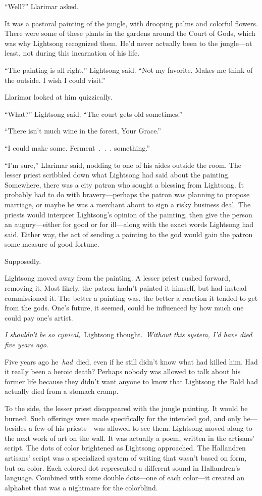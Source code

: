 “Well?” Llarimar asked.

It was a pastoral painting of the jungle, with drooping palms and colorful flowers. There were some of these plants in the gardens around the Court of Gods, which was why Lightsong recognized them. He’d never actually been to the jungle—at least, not during this incarnation of his life.

“The painting is all right,” Lightsong said. “Not my favorite. Makes me think of the outside. I wish I could visit.”

Llarimar looked at him quizzically.

“What?” Lightsong said. “The court gets old sometimes.”

“There isn’t much wine in the forest, Your Grace.”

“I could make some. Ferment~.~.~. something.”

“I’m sure,” Llarimar said, nodding to one of his aides outside the room. The lesser priest scribbled down what Lightsong had said about the painting. Somewhere, there was a city patron who sought a blessing from Lightsong. It probably had to do with bravery—perhaps the patron was planning to propose marriage, or maybe he was a merchant about to sign a risky business deal. The priests would interpret Lightsong’s opinion of the painting, then give the person an augury—either for good or for ill—along with the exact words Lightsong had said. Either way, the act of sending a painting to the god would gain the patron some measure of good fortune.

Supposedly.

Lightsong moved away from the painting. A lesser priest rushed forward, removing it. Most likely, the patron hadn’t painted it himself, but had instead commissioned it. The better a painting was, the better a reaction it tended to get from the gods. One’s future, it seemed, could be influenced by how much one could pay one’s artist.

\textit{I shouldn’t be so cynical,}~Lightsong thought.~\textit{Without this system, I’d have died five years ago.}

Five years ago he~\textit{had}~died, even if he still didn’t know what had killed him. Had it really been a heroic death? Perhaps nobody was allowed to talk about his former life because they didn’t want anyone to know that Lightsong the Bold had actually died from a stomach cramp.

To the side, the lesser priest disappeared with the jungle painting. It would be burned. Such offerings were made specifically for the intended god, and only he—besides a few of his priests—was allowed to see them. Lightsong moved along to the next work of art on the wall. It was actually a poem, written in the artisans’ script. The dots of color brightened as Lightsong approached. The Hallandren artisans’ script was a specialized system of writing that wasn’t based on form, but on color. Each colored dot represented a different sound in Hallandren’s language. Combined with some double dots—one of each color—it created an alphabet that was a nightmare for the colorblind.

